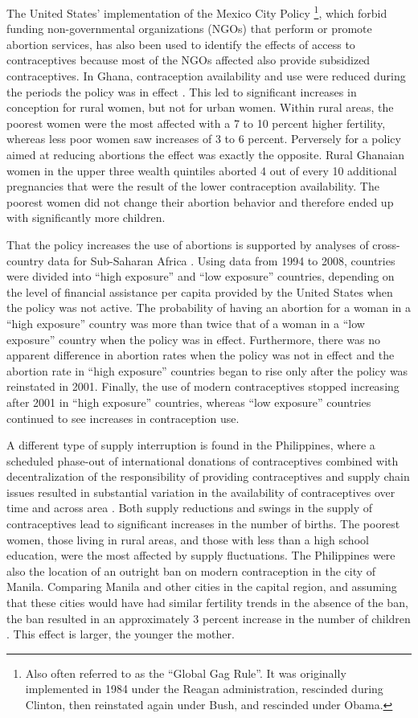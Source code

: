 \documentclass[letterpaper,12pt]{article}
\begin{document}
The United States' implementation of the Mexico City Policy%
\footnote{
Also often referred to as the ``Global Gag Rule''. 
It was originally implemented in 1984 under the Reagan administration, 
rescinded during Clinton, then reinstated again under Bush, and 
rescinded under Obama.
}, which forbid funding non-governmental organizations (NGOs) that perform
or promote abortion services, has also been used to identify the effects
of access to contraceptives because most of the NGOs affected also
provide subsidized contraceptives. 
In Ghana, contraception availability and use were reduced during the
periods the policy was in effect \citep{Jones2015}. 
This led to significant increases in conception for rural women, but not
for urban women. 
Within rural areas, the poorest women were the most affected with a 7 to
10 percent higher fertility, whereas less poor women saw increases of 3
to 6 percent. 
Perversely for a policy aimed at reducing abortions the effect was
exactly the opposite. 
Rural Ghanaian women in the upper three wealth quintiles aborted 4 out
of every 10 additional pregnancies that were the result of the lower
contraception availability. 
The poorest women did not change their abortion behavior and therefore
ended up with significantly more children.

That the policy increases the use of abortions is supported by analyses
of cross-country data for Sub-Saharan Africa \citep{Bendavid2011}. 
Using data from 1994 to 2008, countries were divided into ``high
exposure'' and ``low exposure'' countries, depending on the level of
financial assistance per capita provided by the United States when the
policy was not active. 
The probability of having an abortion for a woman in a ``high exposure''
country was more than twice that of a woman in a ``low exposure''
country when the policy was in effect. 
Furthermore, there was no apparent difference in abortion rates when the
policy was not in effect and the abortion rate in ``high exposure''
countries began to rise only after the policy was reinstated in 2001. 
Finally, the use of modern contraceptives stopped increasing after 2001
in ``high exposure'' countries, whereas ``low exposure'' countries
continued to see increases in contraception use.

A different type of supply interruption is found in the Philippines,
where a scheduled phase-out of international donations of contraceptives
combined with decentralization of the responsibility of providing
contraceptives and supply chain issues resulted in substantial variation
in the availability of contraceptives over time and across area
\citep{Salas2014}. 
Both supply reductions and swings in the supply of contraceptives lead
to significant increases in the number of births. 
The poorest women, those living in rural areas, and those with less than
a high school education, were the most affected by supply fluctuations. 
The Philippines were also the location of an outright ban on modern
contraception in the city of Manila. 
Comparing Manila and other cities in the capital region, and assuming
that these cities would have had similar fertility trends in the absence
of the ban, the ban resulted in an approximately 3 percent increase in
the number of children \citep{Dumas2017}. 
This effect is larger, the younger the mother.
\end{document}
